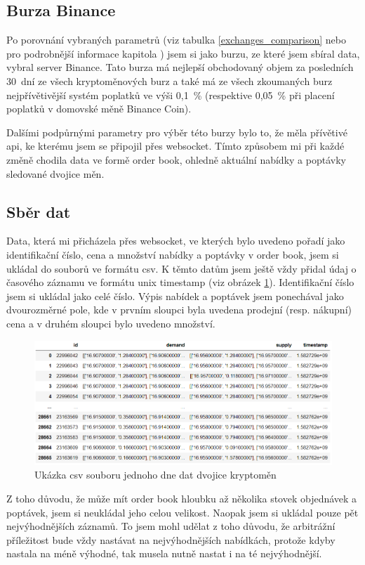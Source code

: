 \documentclass[thesis=B,czech]{FITthesis}[2019/03/21]
\begin{document}
\subsection{Burza Binance}
Po porovnání vybraných parametrů (viz tabulka \ref{exchanges_comparison} nebo pro podrobnější informace kapitola ) jsem si jako burzu, ze které jsem sbíral data, vybral server Binance. Tato burza má nejlepší obchodovaný objem za posledních 30~dní ze všech kryptoměnových burz \cite{coinmarketcap} a také má ze všech zkoumaných burz nejpřívětivější systém poplatků ve výši 0,1~\% (respektive 0,05~\% při placení poplatků v domovské měně Binance Coin).

Dalšími podpůrnými parametry pro výběr této burzy bylo to, že měla přívětivé api, ke kterému jsem se připojil přes websocket. \cite{BinanceApi} Tímto způsobem mi při každé změně chodila data ve formě order book, ohledně aktuální nabídky a poptávky sledované dvojice měn. \cite{BinanceApi}

\subsection{Sběr dat}
Data, která mi přicházela přes websocket, ve kterých bylo uvedeno pořadí jako identifikační číslo, cena a množství nabídky a poptávky v order book, jsem si ukládal do souborů ve formátu csv. K těmto datům jsem ještě vždy přidal údaj o časového záznamu ve formátu unix timestamp (viz obrázek \ref{csv_data}). Identifikační číslo jsem si ukládal jako celé číslo. Výpis nabídek a poptávek jsem ponechával jako dvourozměrné pole, kde v prvním sloupci byla uvedena prodejní (resp. nákupní) cena a v druhém sloupci bylo uvedeno množství.

\begin{figure}\centering
	\includegraphics[width=1\textwidth]{images/csv_data.PNG}
	\caption{Ukázka csv souboru jednoho dne dat dvojice kryptoměn}\label{csv_data}
\end{figure}
Z toho důvodu, že může mít order book hloubku až několika stovek objednávek a poptávek, jsem si neukládal jeho celou velikost. Naopak jsem si ukládal pouze pět nejvýhodnějších záznamů. To jsem mohl udělat z toho důvodu, že arbitrážní příležitost bude vždy nastávat na nejvýhodnějších nabídkách, protože kdyby nastala na méně výhodné, tak musela nutně nastat i na té nejvýhodnější. 
\end{document}
